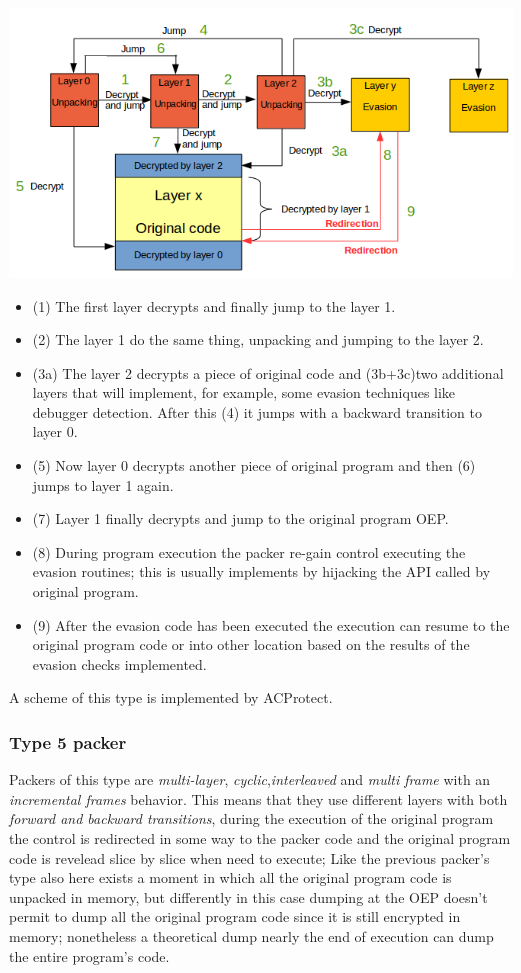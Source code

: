 \includegraphics[width=1.07\textwidth]{pictures/packer_type_4.png} 

\begin{itemize}
\item (1) The first layer decrypts and finally jump to the layer 1.
\item (2) The layer 1 do the same thing, unpacking and jumping to the layer 2.
\item (3a) The layer 2 decrypts a piece of original code and (3b+3c)two additional layers that will implement, for example, some evasion techniques like debugger detection. After this (4) it jumps with a backward transition to layer 0.
\item (5) Now layer 0 decrypts another piece of original program and then (6) jumps to layer 1 again.
\item (7) Layer 1 finally decrypts and jump to the original program OEP.
\item (8) During program execution the packer re-gain control executing the evasion routines; this is usually implements by hijacking the API called by original program.
\item (9) After the evasion code has been executed the execution can resume to the original program code or into other location based on the results of the evasion checks implemented.
\end{itemize}

A scheme of this type is implemented by ACProtect.


\subsubsection{Type 5 packer}

Packers of this type are \textit{multi-layer}, \textit{cyclic},\textit{interleaved} and \textit{multi frame} with an \textit{incremental frames} behavior. This means that they use different layers with both \textit{forward and backward transitions}, during the execution of the original program the control is redirected in some way to the packer code and the original program code is revelead slice by slice when need to execute; Like the previous packer's type also here exists a moment in which all the original program code is unpacked in memory, but differently in this case dumping at the OEP doesn't permit to dump all the original program code since it is still encrypted in memory; nonetheless a theoretical dump nearly the end of execution can dump the entire program's code.

